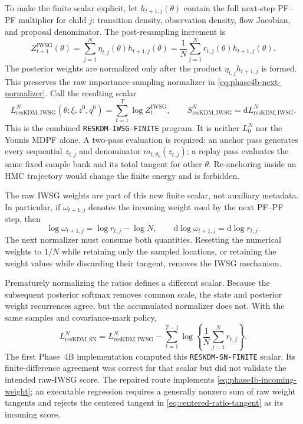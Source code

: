\documentclass[11pt]{article}
\newcommand{\dd}{\mathrm{d}}
\begin{document}
To make the finite scalar explicit, let $h_{t+1,j}(\theta)$ contain the full
next-step PF--PF multiplier for child $j$: transition density, observation
density, flow Jacobian, and proposal denominator.  The post-resampling
increment is
\begin{equation}
 Z_{t+1}^{\mathrm{IWSG}}(\theta)
 =\sum_{j=1}^N\eta_{t,j}(\theta)h_{t+1,j}(\theta)
 =\frac1N\sum_{j=1}^N r_{t,j}(\theta)h_{t+1,j}(\theta).
 \label{eq:phase4b-next-normalizer}
\end{equation}
The posterior weights are normalized only after the product
$\eta_{t,j}h_{t+1,j}$ is formed.  This preserves the raw importance-sampling
normalizer in \eqref{eq:phase4b-next-normalizer}.  Call the resulting scalar
\begin{equation}
 L_{\mathrm{resKDM,IWSG}}^N(\theta;\xi,z^0,q^0)
 =\sum_{t=1}^T\log Z_t^{\mathrm{IWSG}},\qquad
 S_{\mathrm{resKDM,IWSG}}^N=\dd L_{\mathrm{resKDM,IWSG}}^N.
 \label{eq:phase4b-finite-target}
\end{equation}
This is the combined \texttt{RESKDM-IWSG-FINITE} program.  It is neither
$L_0^N$ nor the Younis MDPF alone.  A two-pass evaluation is required: an
anchor pass generates every sequential $z_{t,j}$ and denominator
$m_{t,\theta_0}(z_{t,j})$; a replay pass evaluates the same fixed sample bank
and its total tangent for other $\theta$.  Re-anchoring inside an HMC
trajectory would change the finite energy and is forbidden.

The raw IWSG weights are part of this new finite scalar, not auxiliary
metadata.  In particular, if $\omega_{t+1,j}$ denotes the incoming weight used
by the next PF--PF step, then
\begin{equation}
 \log\omega_{t+1,j}=\log r_{t,j}-\log N,\qquad
 \dd\log\omega_{t+1,j}=\dd\log r_{t,j}.
 \label{eq:phase4b-incoming-weight}
\end{equation}
The next normalizer must consume both quantities.  Resetting the numerical
weights to $1/N$ while retaining only the sampled locations, or retaining the
weight values while discarding their tangent, removes the IWSG mechanism.

Prematurely normalizing the ratios defines a different scalar.  Because the
subsequent posterior softmax removes common scale, the state and posterior
weight recurrences agree, but the accumulated normalizer does not.  With the
same samples and covariance-mark policy,
\begin{equation}
 L_{\mathrm{resKDM,SN}}^N
 =L_{\mathrm{resKDM,IWSG}}^N
  -\sum_{t=1}^{T-1}\log\left\{\frac1N\sum_{j=1}^N r_{t,j}\right\}.
 \label{eq:phase4b-self-normalized-difference}
\end{equation}
The first Phase~4B implementation computed this
\texttt{RESKDM-SN-FINITE} scalar.  Its finite-difference agreement was correct
for that scalar but did not validate the intended raw-IWSG score.  The repaired
route implements \eqref{eq:phase4b-incoming-weight}; an executable regression
requires a generally nonzero sum of raw weight tangents and rejects the
centered tangent in \eqref{eq:centered-ratio-tangent} as its incoming score.
\end{document}

